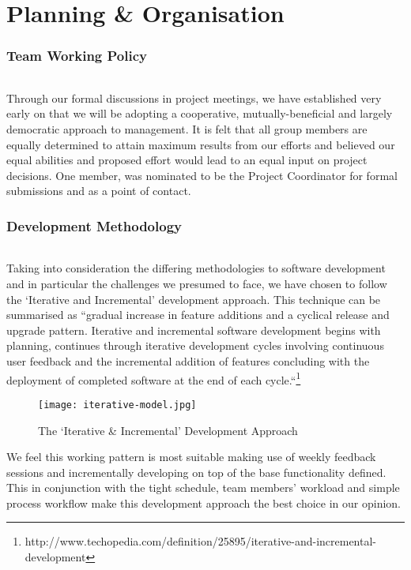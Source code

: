\documentclass[11pt,a4paper]{article}
\begin{document}
\part{Planning \& Organisation}

\section{Team Working Policy}
\paragraph{}
Through our formal discussions in project meetings, we have established very early on that we will be adopting a cooperative, mutually-beneficial and largely democratic approach to management.  It is felt that all group members are equally determined to attain maximum results from our efforts and believed our equal abilities and proposed effort would lead to an equal input on project decisions.  One member, was nominated to be the Project Coordinator for formal submissions and as a point of contact.

\section{Development Methodology}
\paragraph{}
Taking into consideration the differing methodologies to software development and in particular the challenges we presumed to face, we have chosen to follow the ‘Iterative and Incremental’ development approach.  This technique can be summarised as “gradual increase in feature additions and a cyclical release and upgrade pattern.  Iterative and incremental software development begins with planning, continues through iterative development cycles involving continuous user feedback and the incremental addition of features concluding with the deployment of completed software at the end of each cycle.“\footnote{http://www.techopedia.com/definition/25895/iterative-and-incremental-development}

\begin{figure}[hbtp]
\centering
\texttt{[image: iterative-model.jpg]}
\caption{The ‘Iterative \& Incremental' Development Approach}
\end{figure}

We feel this working pattern is most suitable making use of weekly feedback sessions and incrementally developing on top of the base functionality defined.  This in conjunction with the tight schedule, team members’ workload and simple process workflow make this development approach the best choice in our opinion.
\end{document}
